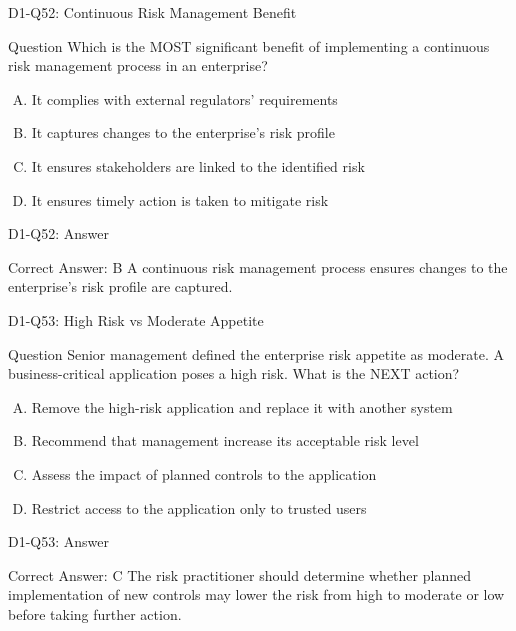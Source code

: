 \documentclass{beamer}
\begin{document}
	\begin{frame}{D1-Q52: Continuous Risk Management Benefit}
		\begin{block}{Question}
			Which is the MOST significant benefit of implementing a continuous risk management process in an enterprise?
		\end{block}
		\begin{enumerate}[(A)]
			\item It complies with external regulators' requirements
			\item It captures changes to the enterprise's risk profile
			\item It ensures stakeholders are linked to the identified risk
			\item It ensures timely action is taken to mitigate risk
		\end{enumerate}
	\end{frame}
	\begin{frame}{D1-Q52: Answer}
		\begin{block}{Correct Answer: B}
			A continuous risk management process ensures changes to the enterprise's risk profile are captured.
		\end{block}
	\end{frame}
	
	\begin{frame}{D1-Q53: High Risk vs Moderate Appetite}
		\begin{block}{Question}
			Senior management defined the enterprise risk appetite as moderate. A business-critical application poses a high risk. What is the NEXT action?
		\end{block}
		\begin{enumerate}[(A)]
			\item Remove the high-risk application and replace it with another system
			\item Recommend that management increase its acceptable risk level
			\item Assess the impact of planned controls to the application
			\item Restrict access to the application only to trusted users
		\end{enumerate}
	\end{frame}
	\begin{frame}{D1-Q53: Answer}
		\begin{block}{Correct Answer: C}
			The risk practitioner should determine whether planned implementation of new controls may lower the risk from high to moderate or low before taking further action.
		\end{block}
	\end{frame}
	
\end{document}

